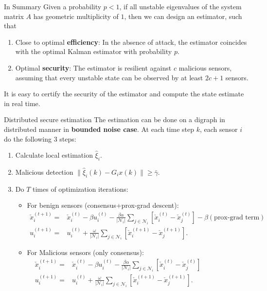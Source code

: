 \documentclass[10pt]{beamer}
\newcommand{\Nc}{{\mathcal N}}
\newcommand{\cx}{{\check{x}}}
\begin{document}
\begin{frame}{In Summary}
  Given a probability $p<1$, if all unstable eigenvalues of the system matrix $A$ has geometric multiplicity of $1$, then we can design an estimator, such that
  \begin{enumerate}
    \item Close to optimal {\bf efficiency}: In the absence of attack, the estimator coincides with the optimal Kalman estimator with probability $p$.
    \item Optimal {\bf security}: The estimator is resilient against $c$ malicious sensors, assuming that every unstable state can be observed by at least $2c+1$ sensors.
  \end{enumerate}
  It is easy to certify the security of the estimator and compute the state estimate in real time. 
\end{frame}

\begin{frame}{Distributed secure estimation}
	The estimation can be done on a digraph in distributed manner in \textbf{bounded noise case}. At each time step $k$, each sensor $i$ do the following 3 steps:
	\begin{enumerate}
		\item Calculate local estimation $\hat{\xi}_i$.
		\item Malicious detection $\|\hat{\xi}_i(k)-G_i x(k)\|\geq \bar{\gamma}$.
		\item Do $T$ times of optimization iterations:
		\begin{itemize}
			\item For benign sensors (consensus+prox-grad descent):
			\begin{align*}
				\cx_i^{(t+1)}=& \cx_i^{(t)}-\beta u_i^{(t)}-\frac{\beta \alpha}{|\Nc_i|}\sum_{j\in\Nc_i} \left[\cx_i^{(t)} -\cx_j^{(t)}\right] - \beta  \left(\text{prox-grad term}\right)\\
				u_i^{(t+1)}=&u_i^{(t)}+\frac{\omega}{|\Nc_i|}\sum_{j\in\Nc_i} \left[\cx_i^{(t+1)} -\cx_j^{(t+1)}\right]. 
			\end{align*}
			\item For Malicious sensors (only consensus): 
			\begin{align*}
				\cx_i^{(t+1)}=& \cx_i^{(t)}-\beta u_i^{(t)}-\frac{\beta \alpha}{|\Nc_i|}\sum_{j\in\Nc_i} \left[\cx_i^{(t)} -\cx_j^{(t)}\right]\\
				u_i^{(t+1)}=&u_i^{(t)}+\frac{\omega}{|\Nc_i|}\sum_{j\in\Nc_i} \left[\cx_i^{(t+1)} -\cx_j^{(t+1)}\right]. \hspace{85pt}
			\end{align*}
	\end{itemize}
	\end{enumerate}

\end{frame}
\end{document}
